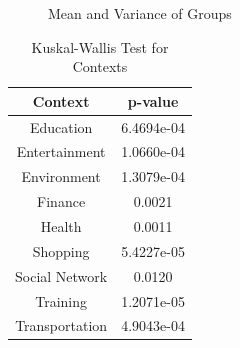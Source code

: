 \begin{figure}[htp]
\caption{Mean and Variance of Groups}
\label{fig:co3}
\end{figure}

\begin{table}[h!]
  \centering
  \caption{Kuskal-Wallis Test for Contexts}
  \label{tab:kw_c}
  \begin{tabular}{cc}
    \toprule
     Context & p-value \\
    \midrule
    Education &  6.4694e-04 \\
    Entertainment & 1.0660e-04\\
    Environment & 1.3079e-04\\
    Finance & 0.0021\\ 
    Health & 0.0011\\
    Shopping & 5.4227e-05\\ 
    Social Network &  0.0120\\
    Training & 1.2071e-05\\
    Transportation & 4.9043e-04\\ 
    \bottomrule
  \end{tabular}
\end{table} 

